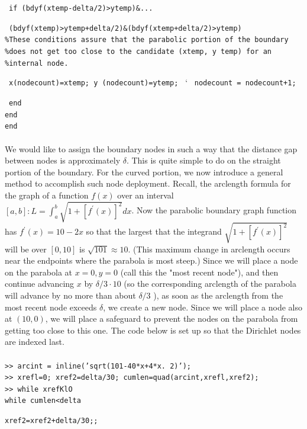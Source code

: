 \documentclass[../main.tex]{subfiles}
\begin{document}
~\texttt{if (bdyf(xtemp-delta/2)>ytemp)\&... }

~\texttt{(bdyf(xtemp)>ytemp+delta/2)\&(bdyf(xtemp+delta/2)>ytemp) }\\
\texttt{\%These conditions assure that the parabolic portion of the boundary}\\
\texttt{\%does not get too close to the candidate (xtemp, y temp) for an}\\
\texttt{\%internal node.}

~\texttt{x(nodecount)=xtemp; y (nodecount)=ytemp; }
`
~\texttt{nodecount = nodecount+1; }


~\texttt{end}\\
\texttt{end}\\
\texttt{end}\\
\\
We would like to assign the boundary nodes in such a way that the distance gap between nodes is approximately $\delta$. This is quite simple to do on the straight portion of the boundary. For the curved portion, we now introduce a general method to accomplish such node deployment. Recall, the arclength formula for the graph of a function $f(x)$ over an interval $[a, b]: L=\int_{a}^{b} \sqrt{1+\left[f^{\prime}(x)\right]^{2}} d x$. Now the parabolic boundary graph function has $f^{\prime}(x)=10-2 x$ so that the largest that the integrand $\sqrt{1+\left[f^{\prime}(x)\right]^{2}}$ will be over $[0,10]$ is $\sqrt{101} \approx 10$. (This maximum change in arclength occurs near the endpoints where the parabola is most steep.) Since we will place a node on the parabola at $x=0, y=0$ (call this the "most recent node"), and then continue advancing $x$ by $\delta / 3 \cdot 10$ (so the corresponding arclength of the parabola will advance by no more than about $\delta / 3$ ), as soon as the arclength from the most recent node exceeds $\delta$, we create a new node. Since we will place a node also at $(10,0)$, we will place a safeguard to prevent the nodes on the parabola from getting too close to this one. The code below is set up so that the Dirichlet nodes are indexed last.
\\
\\
\texttt{>> arcint = inline('sqrt(101-40*x+4*x. 2)'); }\\
\texttt{>> xrefl=0; xref2=delta/30; cumlen=quad(arcint,xrefl,xref2); 
}\\
\texttt{>> while xrefKlO}\\
\texttt{while cumlen<delta}

\texttt{xref2=xref2+delta/30;;}
\end{document}
